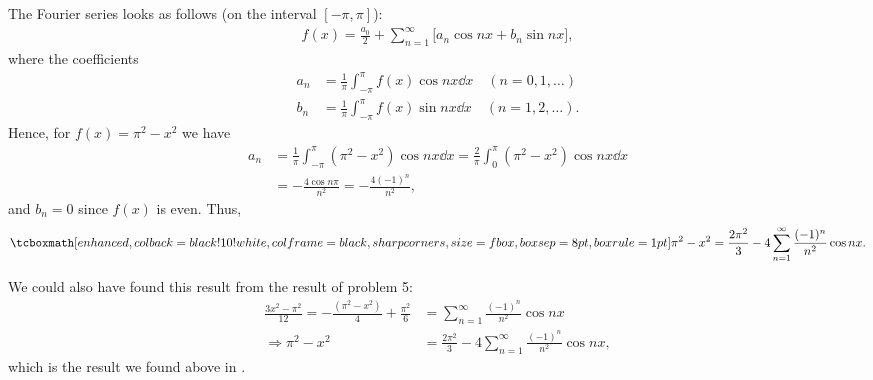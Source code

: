 \def\duedate{10/27/22}
\def\HWnum{7}



    



The Fourier series looks as follows (on the interval $[-\pi,\pi]$):
\begin{eqnarray}
    \label{eq:fourier-series}
    f(x) = \frac{a_0}{2} + \sum_{n=1}^{\infty} \big[ a_{n}\cos{n x} + b_{n}\sin{n x} \big]
,\end{eqnarray}
where the coefficients
\begin{align}
    \label{eq:coeffs}
    a_{n} &= \frac{1}{\pi} \int_{-\pi}^{\pi} f(x) \cos{nx} \dd{x} \quad (n=0,1,\ldots) \\
    b_{n} &= \frac{1}{\pi} \int_{-\pi}^{\pi} f(x) \sin{nx} \dd{x} \quad (n=1,2,\ldots)
.\end{align}
Hence, for $f(x) = \pi^2 - x^2$ we have 
\begin{align}
    \label{eq:an}
    a_{n} &= \frac{1}{\pi} \int_{-\pi}^{\pi} (\pi^2 - x^2)\cos{nx} \dd{x} = \frac{2}{\pi} \int_{0}^{\pi} (\pi^2 - x^2) \cos{nx} \dd{x} \\
          &= -\frac{4\cos{n\pi}}{n^2} = -\frac{4(-1)^{n}}{n^2}
,\end{align}
and $b_{n} = 0$ since $f(x)$ is even. 
Thus,
\begin{eqnarray}
    \label{eq:fourier-pix}
    \eqbox{
    \pi^2 - x^2 = \frac{2\pi^2}{3} -4\sum_{n=1}^{\infty} \frac{(-1)^{n}}{n^2}\cos{nx}
}
.\end{eqnarray}

We could also have found this result from the result of problem 5:
\begin{align}
    \label{eq:3-from-5}
    \frac{3x^2 - \pi^2}{12} = -\frac{(\pi^2 - x^2)}{4} +\frac{\pi^2}{6} &= \sum_{n=1}^{\infty} \frac{(-1)^{n}}{n^2}\cos{nx} \\
    \Rightarrow \pi^2 - x^2 &= \frac{2\pi^2}{3} - 4\sum_{n=1}^{\infty} \frac{(-1)^{n}}{n^2} \cos{nx}
,\end{align}
which is the result we found above in .


